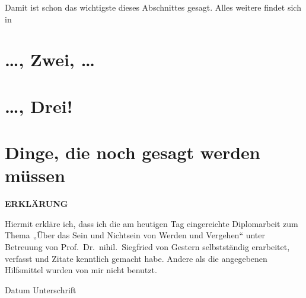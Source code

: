 \documentclass{scrbook}
\begin{document}
Damit ist schon das wichtigste dieses Abschnittes gesagt.  Alles weitere findet
sich in 

\chapter{\dots, Zwei, \dots}
\label{cha:zwei}

\chapter{\dots, Drei!}
\label{cha:drei}

\appendix

\chapter{Dinge, die noch gesagt werden müssen}
\label{cha:dinge-die-noch}

\backmatter

\printindex

\cleardoublepage

\thispagestyle{empty}

\hbox{}\vfill

\textbf{\large ERKLÄRUNG}

\bigskip \medskip

Hiermit erkläre ich, dass ich die am heutigen Tag eingereichte Diplomarbeit zum
Thema „Über das Sein und Nichtsein von Werden und Vergehen“ unter Betreuung von
Prof.~Dr.~nihil.~Siegfried von Gestern selbstständig erarbeitet, verfasst und
Zitate kenntlich gemacht habe. Andere als die angegebenen Hilfsmittel wurden von
mir nicht benutzt.

\vspace*{5\bigskipamount}

Datum \hfill Unterschrift

\normalsize

\vspace*{2\bigskipamount}

\vfill\hbox{}
\end{document}
